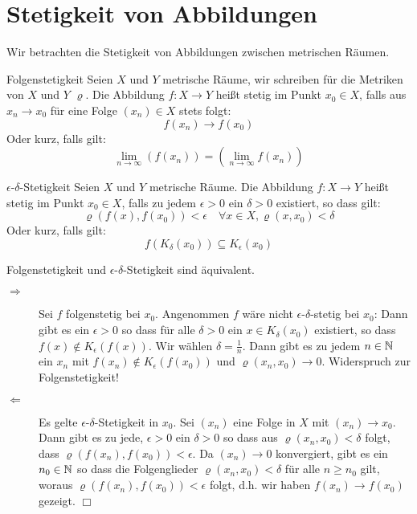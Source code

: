 \chapter{Stetigkeit von Abbildungen}
Wir betrachten die Stetigkeit von Abbildungen zwischen metrischen Räumen.
\begin{definition}{Folgenstetigkeit}
	Seien $X$ und $Y$ metrische Räume, wir schreiben für die Metriken von $X$ und $Y$ $\varrho$.
	Die Abbildung $f:X\rightarrow Y$ heißt stetig im Punkt $x_0\in X$, falls aus $x_n\rightarrow x_0$ für eine Folge $(x_n)\in X$ stets folgt:
	\begin{equation*}
		f(x_n)\rightarrow f(x_0)
	\end{equation*}
	Oder kurz, falls gilt:
	\begin{equation*}
		\lim\limits_{n\to\infty}(f(x_n))=\left(\lim\limits_{n\to\infty}f(x_n)\right)
	\end{equation*}
\end{definition}

\begin{definition}{$\epsilon$-$\delta$-Stetigkeit}
	Seien $X$ und $Y$ metrische Räume.
	Die Abbildung $f:X\rightarrow Y$ heißt stetig im Punkt $x_0\in X$, falls zu jedem $\epsilon>0$ ein $\delta>0$ existiert, so dass gilt:
	\begin{equation*}
		\varrho(f(x),f(x_0))<\epsilon\quad \forall x\in X, \varrho(x,x_0)<\delta
	\end{equation*}
	Oder kurz, falls gilt:
	\begin{equation*}
		f\left(K_\delta(x_0)\right)\subseteq K_\epsilon(x_0)
	\end{equation*}
\end{definition}

\begin{satz}{}
	Folgenstetigkeit und $\epsilon$-$\delta$-Stetigkeit sind äquivalent.
\end{satz}
\beweis
\begin{description}
	\item[\glqq$\Rightarrow$\grqq] Sei $f$ folgenstetig bei $x_0$. Angenommen $f$ wäre nicht $\epsilon$-$\delta$-stetig bei $x_0$:
	Dann gibt es ein $\epsilon>0$ so dass für alle $\delta>0$ ein $x\in K_\delta(x_0)$ existiert, so dass $f(x)\not\in K_\epsilon(f(x))$.
	Wir wählen $\delta=\frac1n$. Dann gibt es zu jedem $n\in\mathbb{N}$ ein $x_n$ mit $f(x_n)\not\in K_\epsilon(f(x_0))$ und $\varrho(x_n,x_0)\to 0$. Widerspruch zur Folgenstetigkeit!
	\item[\glqq$\Leftarrow$\grqq] Es gelte $\epsilon$-$\delta$-Stetigkeit in $x_0$.
	Sei $(x_n)$ eine Folge in $X$ mit $(x_n)\to x_0$.
	Dann gibt es zu jede, $\epsilon>0$ ein $\delta>0$ so dass aus $\varrho(x_n,x_0)<\delta$ folgt, dass $\varrho(f(x_n),f(x_0))<\epsilon$.
	Da $(x_n)\to 0$ konvergiert, gibt es ein $n_0\in\mathbb{N}$ so dass die Folgenglieder $\varrho(x_n,x_0)<\delta$ für alle $n\geq n_0$ gilt, woraus $\varrho(f(x_n),f(x_0))<\epsilon$ folgt, d.h. wir haben $f(x_n)\to f(x_0)$ gezeigt.
	\hfill$\Box$
\end{description}


